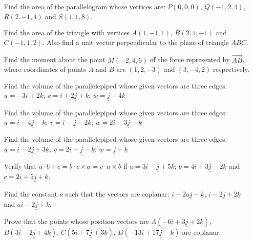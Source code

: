 \documentclass[11pt,a4paper]{article}
\begin{document}
\begin{longlist}
\item Find the area of the parallelogram whose vertices are: $P(0,0,0)$, $Q(-1,2,4)$, $R(2,-1,4)$ and $S(1,1,8)$.

\item Find the area of the triangle with vertices $A(1,-1,1)$, $B(2,1,-1)$ and $C(-1,1,2)$. Also find a unit vector perpendicular to the plane of triangle $ABC$.

\item Find the moment about the point $M(-2,4,6)$ of the force represented by $\overrightarrow{AB}$, where coordinates of points $A$ and $B$ are $(1,2,-3)$ and $(3,-4,2)$ respectively.

\item Find the volume of the parallelepiped whose given vectors are three edges: $\underline{u}=-3\underline{i}+2\underline{k}$; $\underline{v}=\underline{i}+2\underline{j}+\underline{k}$; $\underline{w}=\underline{j}+4\underline{k}$

\item Find the volume of the parallelepiped whose given vectors are three edges: $\underline{u}=\underline{i}-4\underline{j}-\underline{k}$; $\underline{v}=\underline{i}-\underline{j}-2\underline{k}$; $\underline{w}=2\underline{i}-3\underline{j}+\underline{k}$

\item Find the volume of the parallelepiped whose given vectors are three edges: $\underline{u}=\underline{i}-2\underline{j}+3\underline{k}$; $\underline{v}=2\underline{i}-\underline{j}-\underline{k}$; $\underline{w}=\underline{j}+\underline{k}$

\item Verify that $\underline{a}\cdot\underline{b}\times\underline{c}=\underline{b}\cdot\underline{c}\times\underline{a}=\underline{c}\cdot\underline{a}\times\underline{b}$ if $\underline{a}=3\underline{i}-\underline{j}+5\underline{k}$; $\underline{b}=4\underline{i}+3\underline{j}-2\underline{k}$ and $\underline{c}=2\underline{i}+5\underline{j}+\underline{k}$.

\item Find the constant $a$ such that the vectors are coplanar: $\underline{i}-2a\underline{j}-\underline{k}$, $\underline{i}-2\underline{j}+2\underline{k}$ and $a\underline{i}-2\underline{j}+\underline{k}$.

\item Prove that the points whose position vectors are $A(-6\underline{i}+3\underline{j}+2\underline{k})$, $B(3\underline{i}-2\underline{j}+4\underline{k})$, $C(5\underline{i}+7\underline{j}+3\underline{k})$, $D(-13\underline{i}+17\underline{j}-\underline{k})$ are coplanar.


\end{longlist}
\end{document}
